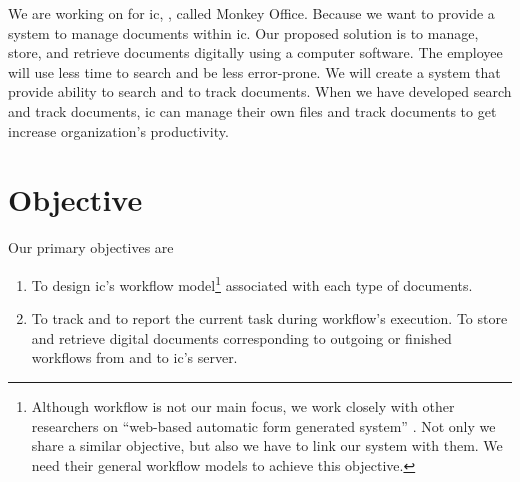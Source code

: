 We are working on \MakeLowercase{\projTitle} for \gls{ic}, \kmitl, called Monkey Office. Because we want to provide a system to manage documents within \gls{ic}. Our proposed solution is to manage, store, and retrieve documents digitally using a computer software.
The employee will use less time to search and be less error-prone.
We will create a system that provide ability to search and to track documents.
When we have developed search and track documents, \gls{ic} can manage their own files and track documents to get increase organization's productivity. 

\section{Objective}
\label{sec:objective}
Our primary objectives are
\begin{enumerate}
\item To design \gls{ic}'s workflow model\footnote{
	Although workflow is not our main focus, we work closely with other researchers on \enquote{web-based automatic form generated system} \cite{web-based-form}.
	Not only we share a similar objective, but also we have to link our system with them.
	We need their general workflow models to achieve this objective.
} associated with each type of documents.
\item To track and to report the current task during workflow's execution. To store and retrieve digital documents corresponding to outgoing or finished workflows from and to \gls{ic}'s server.
\end{enumerate}

